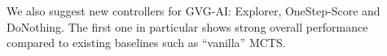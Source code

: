 \documentclass{llncs}
\begin{document}
We also suggest new controllers for GVG-AI: Explorer, OneStep-Score and DoNothing. The first one in particular shows strong overall performance compared to existing baselines such as ``vanilla'' MCTS.





\end{document}
